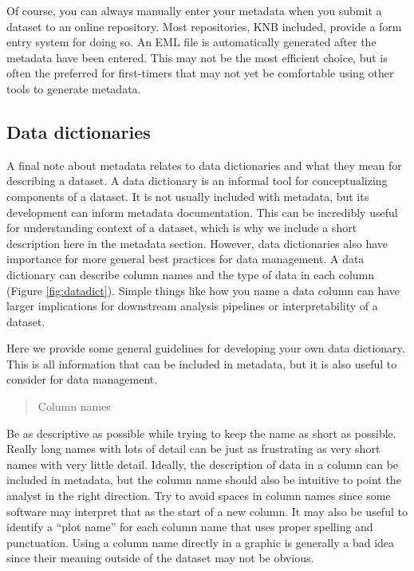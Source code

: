 \documentclass[
]{book}
\begin{document}
Of course, you can always manually enter your metadata when you submit a dataset to an online repository. Most repositories, KNB included, provide a form entry system for doing so. An EML file is automatically generated after the metadata have been entered. This may not be the most efficient choice, but is often the preferred for first-timers that may not yet be comfortable using other tools to generate metadata.

\subsection{Data dictionaries}\label{dict}

A final note about metadata relates to data dictionaries and what they mean for describing a dataset. A data dictionary is an informal tool for conceptualizing components of a dataset. It is not usually included with metadata, but its development can inform metadata documentation. This can be incredibly useful for understanding context of a dataset, which is why we include a short description here in the metadata section. However, data dictionaries also have importance for more general best practices for data management. A data dictionary can describe column names and the type of data in each column (Figure \ref{fig:datadict}). Simple things like how you name a data column can have larger implications for downstream analysis pipelines or interpretability of a dataset.

Here we provide some general guidelines for developing your own data dictionary. This is all information that can be included in metadata, but it is also useful to consider for data management.

\begin{quote}
Column names
\end{quote}

Be as descriptive as possible while trying to keep the name as short as possible. Really long names with lots of detail can be just as frustrating as very short names with very little detail. Ideally, the description of data in a column can be included in metadata, but the column name should also be intuitive to point the analyst in the right direction. Try to avoid spaces in column names since some software may interpret that as the start of a new column. It may also be useful to identify a ``plot name'' for each column name \citep{Broman18} that uses proper spelling and punctuation. Using a column name directly in a graphic is generally a bad idea since their meaning outside of the dataset may not be obvious.
\end{document}
